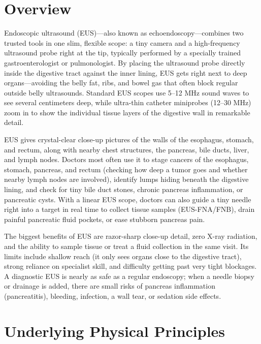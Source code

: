 \label{ch:infographic-eus}

\section{Overview}

Endoscopic ultrasound (EUS)---also known as echoendoscopy---combines two trusted tools in one slim, flexible scope: a tiny camera and a high-frequency ultrasound probe right at the tip, typically performed by a specially trained gastroenterologist or pulmonologist. By placing the ultrasound probe directly inside the digestive tract against the inner lining, EUS gets right next to deep organs---avoiding the belly fat, ribs, and bowel gas that often block regular outside belly ultrasounds. Standard EUS scopes use 5--12 MHz sound waves to see several centimeters deep, while ultra-thin catheter miniprobes (12--30 MHz) zoom in to show the individual tissue layers of the digestive wall in remarkable detail.

EUS gives crystal-clear close-up pictures of the walls of the esophagus, stomach, and rectum, along with nearby chest structures, the pancreas, bile ducts, liver, and lymph nodes. Doctors most often use it to stage cancers of the esophagus, stomach, pancreas, and rectum (checking how deep a tumor goes and whether nearby lymph nodes are involved), identify lumps hiding beneath the digestive lining, and check for tiny bile duct stones, chronic pancreas inflammation, or pancreatic cysts. With a linear EUS scope, doctors can also guide a tiny needle right into a target in real time to collect tissue samples (EUS-FNA/FNB), drain painful pancreatic fluid pockets, or ease stubborn pancreas pain.

The biggest benefits of EUS are razor-sharp close-up detail, zero X-ray radiation, and the ability to sample tissue or treat a fluid collection in the same visit. Its limits include shallow reach (it only sees organs close to the digestive tract), strong reliance on specialist skill, and difficulty getting past very tight blockages. A diagnostic EUS is nearly as safe as a regular endoscopy; when a needle biopsy or drainage is added, there are small risks of pancreas inflammation (pancreatitis), bleeding, infection, a wall tear, or sedation side effects.

\section{Underlying Physical Principles}

